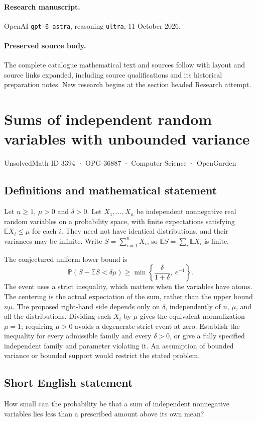\documentclass[11pt,a4paper]{article}
\begin{document}
\paragraph{Research manuscript.} OpenAI \texttt{gpt-6-astra}, reasoning \texttt{ultra}; 11 October 2026.
\paragraph{Preserved source body.} The complete catalogue mathematical text and sources follow with layout and source links expanded, including source qualifications and its historical preparation notes. New research begins at the section headed Research attempt.

\section*{Sums of independent random variables with unbounded variance}\label{3394}
{\small UnsolvedMath ID 3394 · OPG-36887 · Computer Science · OpenGarden}
\subsection{Definitions and mathematical statement}
Let $n\ge1$, $\mu>0$ and $\delta>0$. Let $X_1,\ldots,X_n$ be
independent nonnegative real random variables on a probability space,
with finite expectations satisfying $\mathbb E X_i\le\mu$ for each
$i$. They need not have identical distributions, and their variances
may be infinite. Write $S=\sum_{i=1}^n X_i$, so
$\mathbb E S=\sum_i\mathbb E X_i$ is finite.

The conjectured uniform lower bound is
\[
 \mathbb P(S-\mathbb E S<\delta\mu)
            \ge \min\left\{\frac{\delta}{1+\delta},\ e^{-1}\right\}.
\]
The event uses a strict inequality, which matters when the variables
have atoms. The centering is the actual expectation of the sum,
rather than the upper bound $n\mu$. The proposed right-hand side
depends only on $\delta$, independently of $n$, $\mu$, and all
the distributions. Dividing each $X_i$ by $\mu$ gives the equivalent
normalization $\mu=1$; requiring $\mu>0$ avoids a degenerate strict
event at zero.
Establish the inequality for every admissible family and every
$\delta>0$, or give a fully specified independent family and
parameter violating it. An assumption of bounded variance or
bounded support would restrict the stated problem.
\subsection{Short English statement}
How small can the probability be that a sum of independent nonnegative variables lies less than a prescribed amount above its own mean?
\end{document}
